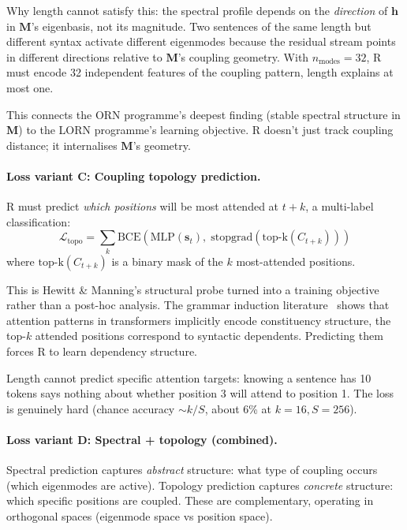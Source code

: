 \documentclass[11pt, a4paper]{article}
\newcommand{\M}{\mathbf{M}}
\newcommand{\h}{\mathbf{h}}
\theoremstyle{plain}
\theoremstyle{definition}
\theoremstyle{remark}
\begin{document}
Why length cannot satisfy this: the spectral profile depends on the \emph{direction} of $\h$ in $\M$'s eigenbasis, not its magnitude.
Two sentences of the same length but different syntax activate different eigenmodes because the residual stream points in different directions relative to $\M$'s coupling geometry.
With $n_{\mathrm{modes}} = 32$, R must encode 32 independent features of the coupling pattern, length explains at most one.

This connects the ORN programme's deepest finding (stable spectral structure in $\M$) to the LORN programme's learning objective.
R doesn't just track coupling distance; it internalises $\M$'s geometry.

\paragraph{Loss variant C: Coupling topology prediction.}
R must predict \emph{which positions} will be most attended at $t + k$, a multi-label classification:
\begin{equation}
\mathcal{L}_{\mathrm{topo}} = \sum_k \mathrm{BCE}\!\left(\mathrm{MLP}(\mathbf{s}_t),\; \mathrm{stopgrad}\!\left(\mathrm{top\text{-}k}(C_{t+k})\right)\right)
\end{equation}
where $\mathrm{top\text{-}k}(C_{t+k})$ is a binary mask of the $k$ most-attended positions.

This is Hewitt \& Manning's structural probe turned into a training objective rather than a post-hoc analysis.
The grammar induction literature~\cite{kim2024grammar} shows that attention patterns in transformers implicitly encode constituency structure, the top-$k$ attended positions correspond to syntactic dependents.
Predicting them forces R to learn dependency structure.

Length cannot predict specific attention targets: knowing a sentence has 10 tokens says nothing about whether position 3 will attend to position 1.
The loss is genuinely hard (chance accuracy $\sim k/S$, about 6\% at $k = 16, S = 256$).

\paragraph{Loss variant D: Spectral + topology (combined).}
Spectral prediction captures \emph{abstract} structure: what type of coupling occurs (which eigenmodes are active).
Topology prediction captures \emph{concrete} structure: which specific positions are coupled.
These are complementary, operating in orthogonal spaces (eigenmode space vs position space).
\end{document}
